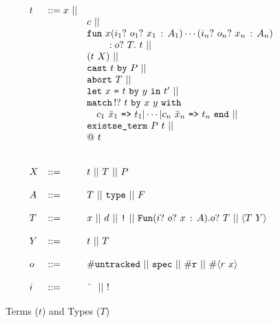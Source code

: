\documentclass[9pt,natbib]{sigplanconf}
\newcommand{\Eq}[0]{\texttt{=}}
\newcommand{\bang}[0]{\texttt{!}}
\begin{document}
\begin{figure}
\[
\begin{array}{lll}
t & ::= x\ ||\\
\ & \ &   c\ ||\\ 
\ & \ &    \texttt{fun}\ x(i_1?\ o_1?\ x_1\,:\,A_1)\cdots(i_n?\ o_n?\ x_n\,:\, A_n)\\
\ & \ & \ \ \ \ \ \ \  : o?\ T .\ t\ ||\\
\ & \ &    (t\ X)\ || \\ 
\ & \ &         \texttt{cast}\ t\ \texttt{by}\ P  \ ||\\
\ & \ &  \texttt{abort}\ T\ ||\\ 
\ & \ &  \texttt{let}\ x\ \Eq\ t\ \texttt{by}\ y\ \texttt{in}\ t' \ ||\ 
\\ 
\ & \ &  \texttt{match}\, !?\ t\ \texttt{by}\ x\ y \ \texttt{with}\\
\ & \ &  \ \ \ c_1\ \bar{x}_1\ \texttt{=>}\ t_1 |
 \cdots | c_n\ \bar{x}_n\ \texttt{=>}\ t_n\ \texttt{end}\ ||\\
\ & \ &  \texttt{existse\_term}\ P\ t\ || \\
\ & \ &  @\ t \\
\\
\\
X & ::= & t\ ||\ T\ ||\ P
\\
\\
A & ::= & T\ ||\ \texttt{type}\ ||\ F 
\\
\\
T & ::= & x\ ||\ d\ ||\ \bang\ ||\ 
     \texttt{Fun}(i?\ o?\ x\,:\,A) . o?\ T\ ||\ \langle T\ Y\rangle 
\\
\\
Y & ::= & t\ ||\ T
\\
\\
o & ::= & \#\texttt{untracked}\ ||\ \texttt{spec}\ ||\ \#\texttt{r}\ ||\ \#\langle r\ x\rangle
\\
\\
i & ::= & \textnormal{\^{\ }}\ ||\ !\ 
\end{array}
\]
\caption{\label{fig:terms} Terms ($t$) and Types ($T$)}
\end{figure}
\end{document}
